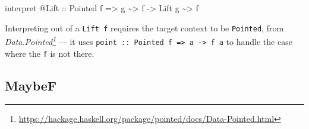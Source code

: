 \documentclass[]{article}
\newenvironment{Shaded}{}{}
\newcommand{\DataTypeTok}[1]{\textcolor[rgb]{0.56,0.13,0.00}{#1}}
\newcommand{\NormalTok}[1]{#1}
\newcommand{\OperatorTok}[1]{\textcolor[rgb]{0.40,0.40,0.40}{#1}}
\newcommand{\OtherTok}[1]{\textcolor[rgb]{0.00,0.44,0.13}{#1}}
\renewcommand{\href}[2]{#2\footnote{\url{#1}}}
\begin{document}
\begin{itemize}
\begin{Shaded}
\begin{Highlighting}[]
\NormalTok{interpret }\OperatorTok{@}\DataTypeTok{Lift}
\OtherTok{    ::} \DataTypeTok{Pointed}\NormalTok{ f}
    \OtherTok{=\textgreater{}}\NormalTok{ g }\OperatorTok{\textasciitilde{}\textgreater{}}\NormalTok{ f}
    \OtherTok{{-}\textgreater{}} \DataTypeTok{Lift}\NormalTok{ g }\OperatorTok{\textasciitilde{}\textgreater{}}\NormalTok{ f}
\end{Highlighting}
\end{Shaded}

  Interpreting out of a \texttt{Lift\ f} requires the target context to be
  \texttt{Pointed}, from
  \emph{\href{https://hackage.haskell.org/package/pointed/docs/Data-Pointed.html}{Data.Pointed}}
  --- it uses
  \texttt{point\ ::\ Pointed\ f\ =\textgreater{}\ a\ -\textgreater{}\ f\ a} to
  handle the case where the \texttt{f} is not there.
\end{itemize}

\subsection{MaybeF}\label{maybef}
\end{document}
